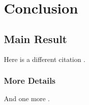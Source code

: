 \chapter{Conclusion}

\section{Main Result}
Here is a different citation .  

\subsection{More Details}

And one more .
